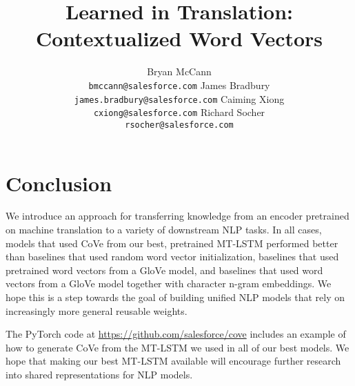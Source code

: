 \documentclass{article}
\title{Learned in Translation: Contextualized Word Vectors}
\author{
Bryan McCann \\
  \texttt{bmccann@salesforce.com}
  \And James Bradbury  \\
  \texttt{james.bradbury@salesforce.com}
  \And Caiming Xiong \\
  \texttt{cxiong@salesforce.com} 
  \And Richard Socher \\
  \texttt{rsocher@salesforce.com}
}
\begin{document}
\maketitle










\section{Conclusion}
We introduce an approach for transferring knowledge from an encoder pretrained on machine translation to a variety of downstream NLP tasks. 
In all cases, models that used CoVe from our best, pretrained MT-LSTM performed better than baselines that used random word vector initialization, baselines that used pretrained word vectors from a GloVe model, and baselines that used word vectors from a GloVe model together with character n-gram embeddings.
We hope this is a step towards the goal of building unified NLP models that rely on increasingly more general reusable weights.

The PyTorch code at \url{https://github.com/salesforce/cove} includes an example of how to generate CoVe from the MT-LSTM we used in all of our best models. We hope that making our best MT-LSTM available will encourage further research into shared representations for NLP models.

\small


\end{document}

